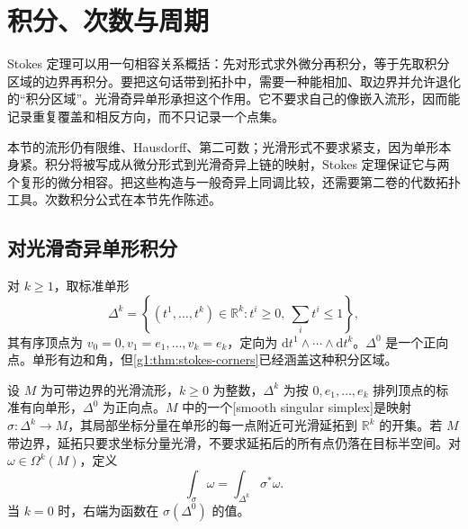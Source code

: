 
% 
% 
% 
% 
% 

\section{积分、次数与周期}
\label{g1:sec:1405}

Stokes 定理可以用一句相容关系概括：先对形式求外微分再积分，等于先取积分区域的边界再积分。要把这句话带到拓扑中，需要一种能相加、取边界并允许退化的“积分区域”。光滑奇异单形承担这个作用。它不要求自己的像嵌入流形，因而能记录重复覆盖和相反方向，而不只记录一个点集。

\ProseParagraphBreak

本节的流形仍有限维、Hausdorff、第二可数；光滑形式不要求紧支，因为单形本身紧。积分将被写成从微分形式到光滑奇异上链的映射，Stokes 定理保证它与两个复形的微分相容。把这些构造与一般奇异上同调比较，还需要第二卷的代数拓扑工具。次数积分公式在本节先作陈述。

\subsection{对光滑奇异单形积分}
\label{g1:subsec:1405:01}

对 \(k\geq1\)，取标准单形
\[
	\Delta^k=\left\{(t^1,\ldots,t^k)\in\mathbb R^k:t^i\geq0,\ \sum_i t^i\leq1\right\},
\]
其有序顶点为 \(v_0=0,v_1=e_1,\ldots,v_k=e_k\)，定向为 \(\mathrm{d}t^1\wedge\cdots\wedge\mathrm{d}t^k\)。\(\Delta^0\) 是一个正向点。单形有边和角，但\cref{g1:thm:stokes-corners}已经涵盖这种积分区域。

\begin{definition}
	\label{g1:def:smooth-singular-simplex}
	设 \(M\) 为可带边界的光滑流形，\(k\ge0\) 为整数，\(\Delta^k\) 为按 \(0,e_1,\ldots,e_k\) 排列顶点的标准有向单形，\(\Delta^0\) 为正向点。\(M\) 中的一个[smooth singular simplex]是映射 \(\sigma:\Delta^k\to M\)，其局部坐标分量在单形的每一点附近可光滑延拓到 \(\mathbb R^k\) 的开集。若 \(M\) 带边界，延拓只要求坐标分量光滑，不要求延拓后的所有点仍落在目标半空间。对 \(\omega\in\Omega^k(M)\)，定义
	\[
		\int_\sigma\omega=\int_{\Delta^k}\sigma^*\omega.
	\]
	当 \(k=0\) 时，右端为函数在 \(\sigma(\Delta^0)\) 的值。
\end{definition}

